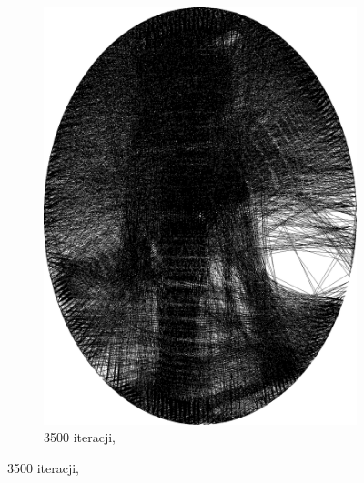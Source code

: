 \begin{figure}[H]
\begin{subfigure}{0.19\textwidth}
            \includegraphics[width = \textwidth]{img/2-theory/aldrin/010mask-aldrin_ellipse_3500_threaded.png}
            \caption{3500 iteracji, }
            \label{theory-technics-mask-aldrin-threaded-j}
        \end{subfigure}
        

\end{figure}
